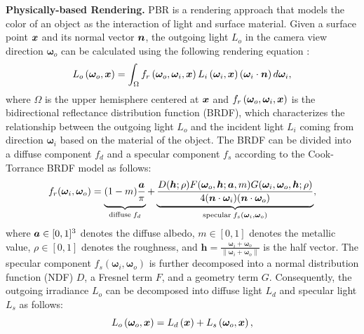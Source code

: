 \documentclass{article} %
\begin{document}
\textbf{Physically-based Rendering.} PBR is a rendering approach that models the color of an object as the interaction of light and surface material. Given a surface point ${\bm{x}}$ and its normal vector ${\bm{n}}$, the outgoing light $L_o$ in the camera view direction $\bm{\omega}_o$ can be calculated using the following rendering equation \citep{kajiya1986rendering}:
\begin{equation}\label{rendering equation}
    L_o\left(\boldsymbol{\omega}_o, {\bm{x}}\right)=\int_{\Omega} f_r\left(\boldsymbol{\omega}_o, \boldsymbol{\omega}_i, {\bm{x}}\right) L_i\left(\boldsymbol{\omega}_i, {\bm{x}}\right)\left(\boldsymbol{\omega}_i \cdot {\bm{n}}\right) d \boldsymbol{\omega}_i,
\end{equation}
where $\Omega$ is the upper hemisphere centered at ${\bm{x}}$ and $f_r\left(\boldsymbol{\omega}_o, \boldsymbol{\omega}_i, {\bm{x}}\right)$ is the bidirectional reflectance distribution function (BRDF), which characterizes the relationship between the outgoing light $L_o$ and the incident light $L_i$ coming from direction $\bm{\omega}_i$ based on the material of the object. The BRDF can be divided into a diffuse component $f_d$ and a specular component $f_s$ according to the Cook-Torrance BRDF model \citep{cook1982reflectance} as follows:
\begin{equation}
    f_r(\boldsymbol{\omega}_i, \boldsymbol{\omega}_o)=\underbrace{\vphantom{\frac{F(\boldsymbol{\omega}_o, \vh; \va, m)}{4(\boldsymbol{n} \cdot \boldsymbol{\omega}_i}}(1-m) \frac{\boldsymbol{a}}{\pi}}_{\text {diffuse}\; f_d}+\underbrace{\frac{D(\vh;\rho) F(\boldsymbol{\omega}_o, \vh; \va, m) G(\boldsymbol{\omega}_i,\boldsymbol{\omega}_o,\vh;\rho)}{4(\boldsymbol{n} \cdot \boldsymbol{\omega}_i)(\boldsymbol{n} \cdot \boldsymbol{\omega}_o)}}_{\text {specular}\; f_s(\bm{\omega}_i, \bm{\omega}_o)},
\end{equation}
where ${\bm{a}} \in [0, 1]^3$ denotes the diffuse albedo, $m \in [0, 1]$ denotes the metallic value, $\rho \in [0, 1]$ denotes the roughness, and $\bm{h} = \frac{\bm{\omega}_i+\bm{\omega}_o}{\|\bm{\omega}_i+\bm{\omega}_o \|}$ is the half vector. The specular component  $f_s(\bm{\omega}_i, \bm{\omega}_o)$ is further decomposed into a normal distribution function (NDF) $D$, a Fresnel term $F$, and a geometry term $G$. Consequently, the outgoing irradiance $L_o$ can be decomposed into diffuse light $L_d$ and specular light $L_s$ as follows:
\begin{equation}
    L_o\left(\boldsymbol{\omega}_o, {\bm{x}}\right) = L_d\left({\bm{x}}\right)+ L_s\left(\boldsymbol{\omega}_o, {\bm{x}}\right),
\end{equation}
\end{document}
